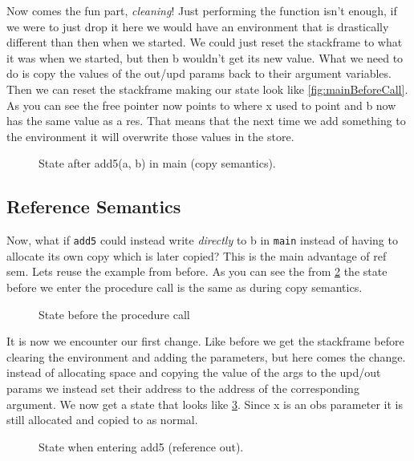 Now comes the fun part, \textit{cleaning}! Just performing the function isn't enough, if we were to just drop it here we would have an environment that 
is drastically different than then when we started. We could just reset the stackframe to what it was when we started, but then b wouldn't get its new value. 
What we need to do is copy the values of the out/upd params back to their argument variables. Then we can reset the stackframe making our state look like
\cref{fig:mainBeforeCall}. As you can see the free pointer now points to where x used to point and b now has the same value as a res. That means that the next time we add something to the environment it will
overwrite those values in the store.     
    
\begin{figure}[!h]
    \caption{State after add5(a, b) in main (copy semantics).}
    \label{fig:mainAfterCall}
\end{figure}

    \subsection{Reference Semantics}
        Now, what if \verb+add5+ could instead write \emph{directly} to b
        in \verb+main+ instead of having to allocate its own copy which is later copied?
        This is the main advantage of \gls{ref sem}. Lets reuse the example from before.
        As you can see the from \cref{fig:mainBeforeCall2} the state before we enter the procedure call is the same as during copy semantics.
        \begin{figure}[!h]
            \caption{State before the procedure call}
            \label{fig:mainBeforeCall2}
        \end{figure}
        
        It is now we encounter our first change. Like before we get the stackframe before clearing the environment and adding the parameters, but here comes the change.
        instead of allocating space and copying the value of the args to the upd/out params we instead set their address to the address of the corresponding argument.
        We now get a state that looks like \cref{fig:mainBeginCallRef}. Since x is an obs parameter it is still allocated and copied to as normal.
        \begin{figure}[!h]
            \caption{State when entering add5 (reference out).}
            \label{fig:mainBeginCallRef}
        \end{figure}

